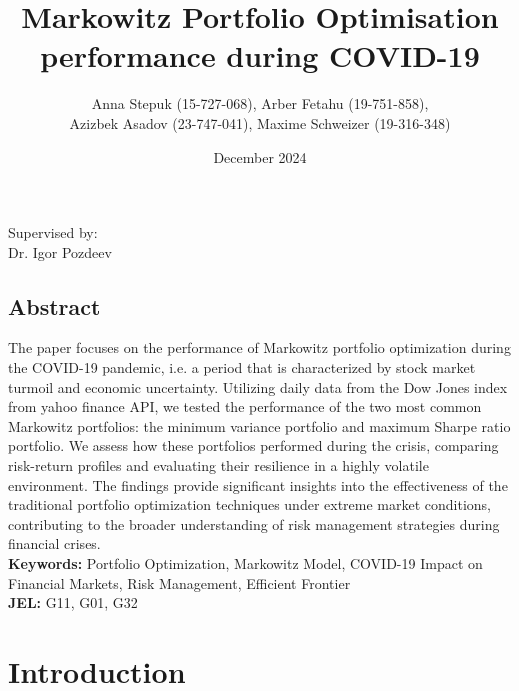 \documentclass[a4paper,12pt]{article}
\title{Markowitz Portfolio Optimisation performance during COVID-19}
\author{Anna Stepuk (15-727-068), Arber Fetahu (19-751-858), \\Azizbek Asadov (23-747-041), Maxime Schweizer (19-316-348)}
\date{December 2024}
\begin{document}
\maketitle

\vspace{0.5em}
\normalsize
\begin{flushleft}
Supervised by:\\ 
Dr. Igor Pozdeev
\end{flushleft}

\onehalfspacing
\begin{center}
\section*{Abstract}
\end{center}
The paper focuses on the performance of Markowitz portfolio optimization during the COVID-19 pandemic, i.e. a period that is characterized by stock market turmoil and economic uncertainty. Utilizing daily data from the Dow Jones index from yahoo finance API, we tested the performance of the two most common Markowitz portfolios: the minimum variance portfolio and maximum Sharpe ratio portfolio. We assess how these portfolios performed during the crisis, comparing risk-return profiles and evaluating their resilience in a highly volatile environment. The findings provide significant insights into the effectiveness of the traditional portfolio optimization techniques under extreme market conditions, contributing to the broader understanding of risk management strategies during financial crises. \\
\vfill
\noindent\textbf{Keywords:} Portfolio Optimization, Markowitz Model, COVID-19 Impact on Financial Markets, Risk Management, Efficient Frontier\\
\noindent\textbf{JEL:} G11, G01, G32


\newpage
{}
\section{Introduction \label{intro}}
\end{document}

